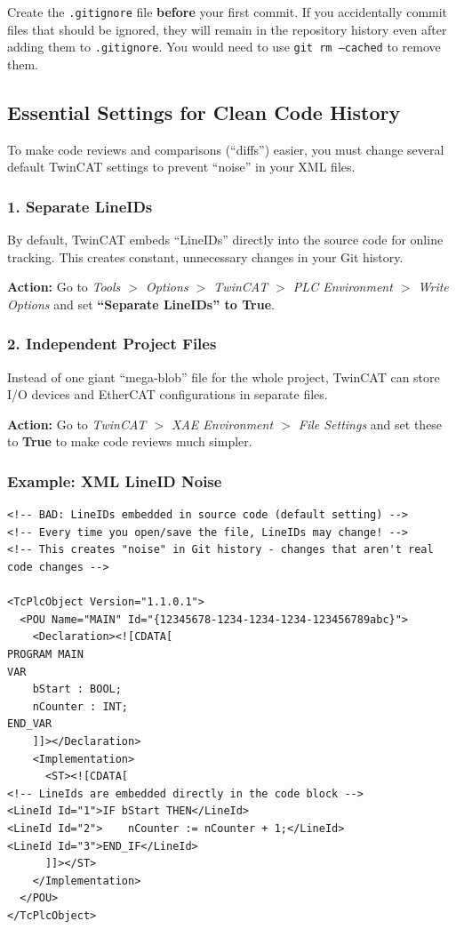 \documentclass[11pt,a4paper]{article}
\begin{document}
\begin{notebox}
Create the \texttt{.gitignore} file \textbf{before} your first commit. If you accidentally commit files that should be ignored, they will remain in the repository history even after adding them to \texttt{.gitignore}. You would need to use \texttt{git rm --cached} to remove them.
\end{notebox}

\subsection{Essential Settings for Clean Code History}

To make code reviews and comparisons (``diffs'') easier, you must change several default TwinCAT settings to prevent ``noise'' in your XML files.

\subsubsection{1. Separate LineIDs}

By default, TwinCAT embeds ``LineIDs'' directly into the source code for online tracking. This creates constant, unnecessary changes in your Git history.

\textbf{Action:} Go to \textit{Tools $>$ Options $>$ TwinCAT $>$ PLC Environment $>$ Write Options} and set \textbf{``Separate LineIDs'' to True}.

\subsubsection{2. Independent Project Files}

Instead of one giant ``mega-blob'' file for the whole project, TwinCAT can store I/O devices and EtherCAT configurations in separate files.

\textbf{Action:} Go to \textit{TwinCAT $>$ XAE Environment $>$ File Settings} and set these to \textbf{True} to make code reviews much simpler.

\subsubsection*{Example: XML LineID Noise}

\begin{lstlisting}[style=xmlstyle]
<!-- BAD: LineIDs embedded in source code (default setting) -->
<!-- Every time you open/save the file, LineIDs may change! -->
<!-- This creates "noise" in Git history - changes that aren't real code changes -->

<TcPlcObject Version="1.1.0.1">
  <POU Name="MAIN" Id="{12345678-1234-1234-1234-123456789abc}">
    <Declaration><![CDATA[
PROGRAM MAIN
VAR
    bStart : BOOL;
    nCounter : INT;
END_VAR
    ]]></Declaration>
    <Implementation>
      <ST><![CDATA[
<!-- LineIds are embedded directly in the code block -->
<LineId Id="1">IF bStart THEN</LineId>
<LineId Id="2">    nCounter := nCounter + 1;</LineId>
<LineId Id="3">END_IF</LineId>
      ]]></ST>
    </Implementation>
  </POU>
</TcPlcObject>
\end{lstlisting}
\end{document}
